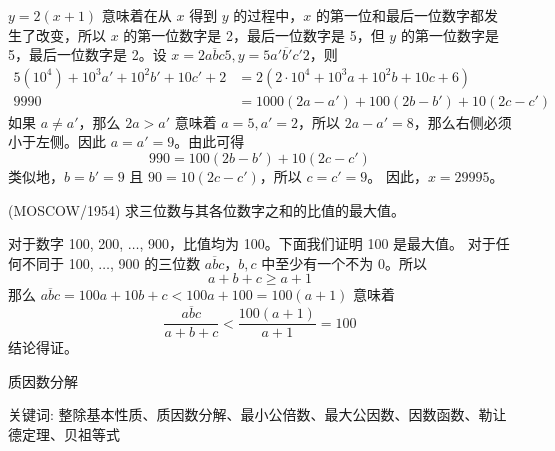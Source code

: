 \begin{questions}
\begin{solution}
$y = 2(x + 1)$ 意味着在从 $x$ 得到 $y$ 的过程中，$x$ 的第一位和最后一位数字都发生了改变，所以 $x$ 的第一位数字是 2，最后一位数字是 5，但 $y$ 的第一位数字是 5，最后一位数字是 2。设 $x = \overline{2abc5}, y = \overline{5a'b'c'2}$，则
\begin{align*}
5(10^4) + 10^3 a' + 10^2 b' + 10c' + 2 &= 2(2 \cdot 10^4 + 10^3 a + 10^2 b + 10c + 6) \\
9990 &= 1000(2a - a') + 100(2b - b') + 10(2c - c')
\end{align*}
如果 $a \neq a'$，那么 $2a > a'$ 意味着 $a = 5, a' = 2$，所以 $2a - a' = 8$，那么右侧必须小于左侧。因此 $a = a' = 9$。由此可得
\[
990 = 100(2b - b') + 10(2c - c')
\]
类似地，$b = b' = 9$ 且 $90 = 10(2c - c')$，所以 $c = c' = 9$。
因此，$x = 29995$。
\end{solution}

\question (MOSCOW/1954) 求三位数与其各位数字之和的比值的最大值。

\begin{solution}
对于数字 100, 200, $\dots$, 900，比值均为 100。下面我们证明 100 是最大值。
对于任何不同于 100, $\dots$, 900 的三位数 $\overline{abc}$，$b, c$ 中至少有一个不为 0。所以
\[
a + b + c \geq a + 1
\]
那么 $\overline{abc} = 100a + 10b + c < 100a + 100 = 100(a + 1)$ 意味着
\[
\frac{\overline{abc}}{a + b + c} < \frac{100(a + 1)}{a + 1} = 100
\]
结论得证。
\end{solution}


\end{questions}

\pagebreak

\begin{center}
  {\fontsize{30pt}{26pt}\selectfont
    \hypertarget{质因数分解}{质因数分解} \label{质因数分解}
  }
\end{center}
\separator
\begin{center}
    关键词: 整除基本性质、质因数分解、最小公倍数、最大公因数、因数函数、勒让德定理、贝祖等式
\end{center}
\vspace{0.5pt}

